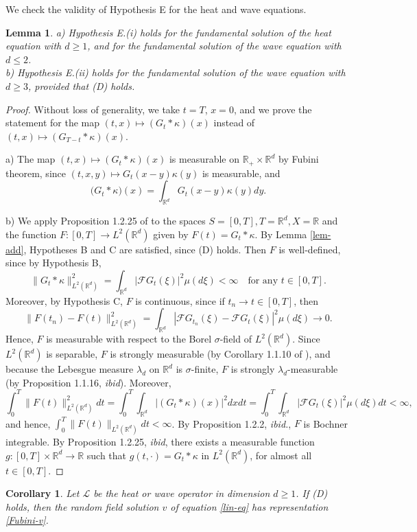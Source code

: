 \documentclass[12pt]{article}
\newtheorem{corollary}[theorem]{Corollary}
\newtheorem{lemma}[theorem]{Lemma}
\def\cF{\mathcal{F}}
\def\cL{\mathcal{L}}
\def\bR{\mathbb{R}}
\def\k{\kappa}
\begin{document}
We check the validity of Hypothesis E for the heat and wave equations.

\begin{lemma}
a) Hypothesis E.(i) holds for the fundamental solution of the heat equation with $d\geq 1$, and for the fundamental solution of the wave equation with $d\leq 2$.\\
b) Hypothesis E.(ii) holds for the fundamental solution of the wave equation with $d\geq 3$, provided that (D) holds.
\end{lemma}

\begin{proof} 
Without loss of generality, we take $t=T$, $x=0$, and we prove the statement for the map $(t,x) \mapsto(G_t * \k)(x)$ instead of $(t,x) \mapsto (G_{T-t} * \k)(x)$.

a) The map $(t,x) \mapsto (G_t*\k)(x)$ is measurable on $\bR_{+} \times \bR^d$ by Fubini theorem, since $(t,x,y) \mapsto G_t(x-y)\k(y)$ is measurable, and
\[
\big(G_t* \k \big)(x)=\int_{\bR^d}G_t(x-y) \k(y)dy.
\]

b) We apply Proposition 1.2.25 of \cite{HNVW} to the spaces $S=[0,T],T=\bR^d,X=\bR$ and the function $F:[0,T] \to L^2(\bR^d)$ given by $F(t)=G_t*\k$. By Lemma \ref{lem-add}, Hypotheses B and C are satisfied, since (D) holds.
Then
$F$ is well-defined, since by Hypothesis B,
\[
\|G_t*\k\|_{L^2(\bR^d)}^2=\int_{\bR^d}|\cF G_t(\xi)|^2 \mu(d\xi)<\infty \quad \mbox{for any $t \in [0,T]$}.
\]
Moreover, by Hypothesis C, $F$ is continuous, since if $t_n \to t\in [0,T]$, then
\[
\|F(t_n)-F(t)\|_{L^2(\bR^d)}^2=\int_{\bR^d} |\cF G_{t_n}(\xi)-\cF G_t(\xi)|^2 \mu(d\xi) \to 0.
\]
Hence, $F$ is measurable with respect to the Borel $\sigma$-field of $L^2(\bR^d)$.
Since $L^2(\bR^d)$ is separable, $F$ is strongly measurable (by Corollary 1.1.10 of \cite{HNVW}), and because the Lebesgue measure $\lambda_d$ on $\bR^d$ is $\sigma$-finite, $F$ is strongly $\lambda_d$-measurable (by Proposition 1.1.16, {\em ibid}). Moreover,
\[
\int_0^T \|F(t)\|_{L^2(\bR^d)}^2 dt =\int_0^T \int_{\bR^d}|(G_t*\k)(x)|^2 dxdt=\int_0^T \int_{\bR^d}|\cF G_t(\xi)|^2 \mu(d\xi)dt<\infty,
\]
and hence, $\int_0^T \|F(t)\|_{L^2(\bR^d)} dt <\infty$. By Proposition 1.2.2, {\em ibid.}, $F$ is Bochner integrable. By Proposition 1.2.25, {\em ibid}, there exists a measurable function $g:[0,T] \times \bR^d \to \bR$ such that $g(t,\cdot)= G_{t}*\k$ in $L^2(\bR^d)$, for almost all $t \in [0,T]$.
\end{proof}


\begin{corollary}
\label{cor-Fub}
Let $\cL$ be the heat or wave operator in dimension $d\geq 1$. If (D) holds, then the random field solution $v$ of equation \eqref{lin-eq} has representation \eqref{Fubini-v}.
\end{corollary}
\end{document}
